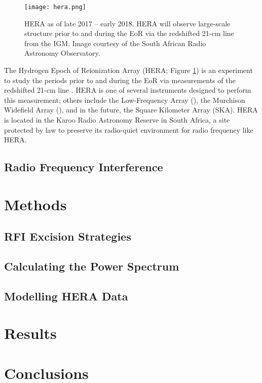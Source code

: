 \documentclass[12pt]{article}
\begin{document}
\begin{figure}[tb]
	\centering
	\texttt{[image: hera.png]}
	\caption[HERA as of late 2017 -- early 2018]{HERA as of late 2017 -- early 2018. HERA will observe large-scale structure prior to and during the EoR via the redshifted 21-cm line from the IGM. Image courtesy of the South African Radio Astronomy Observatory.}
	\label{fig:hera}
\end{figure}

The Hydrogen Epoch of Reionization Array (HERA; Figure \ref{fig:hera}) is an experiment to study the periods prior to and during the EoR  via measurements of the redshifted 21-cm line \citep{deboer2017}. HERA is one of several instruments designed to perform this measurement; others include the Low-Frequency Array (), the Murchison Widefield Array (), and in the future, the Square Kilometer Array (SKA). HERA is located in the Karoo Radio Astronomy Reserve in South Africa, a site protected by law to preserve its radio-quiet environment for radio frequency  like HERA.

\subsection{Radio Frequency Interference} \label{subsec:rfi}

\section{Methods} \label{sec:methods}

\subsection{RFI Excision Strategies} \label{subsec:rfi_excision}

\subsection{Calculating the Power Spectrum} \label{subsec:calc_ps}

\subsection{Modelling HERA Data} \label{subsec:modelling}

\section{Results}

\section{Conclusions}



\end{document}
